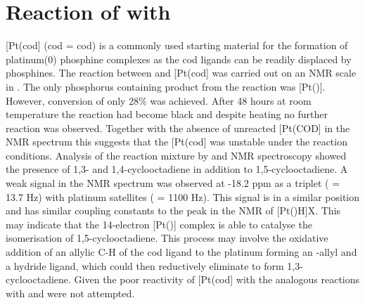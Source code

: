 
\section{Reaction of \tButhixantphos{} with \texorpdfstring{\ce{[Pt(cod)2]}} P}

[Pt(\acrshort{cod}] (\acrshort{cod} = \acrlong{cod}) is a commonly used starting material for the formation of platinum(0) phosphine complexes as the cod ligands can be readily displaced by phosphines.\cite{Green1975b, Green1977c}  The reaction between \tButhixantphos{} and [Pt(cod] was carried out on an NMR scale in .  The only phosphorus containing product from the reaction was [Pt(\tButhixantphos)].  However, conversion of only 28\% was achieved.  After 48 hours at room temperature the reaction had become black and despite heating no further reaction was observed.  Together with the absence of unreacted [Pt(COD] in the \proton{} NMR spectrum this suggests that the [Pt(cod] was unstable under the reaction conditions.  Analysis of the reaction mixture by \proton{} and \carbon{} NMR spectroscopy showed the presence of 1,3- and 1,4-cyclooctadiene in addition to 1,5-cyclooctadiene.  A weak signal in the \proton{} NMR spectrum was observed at -18.2 ppm as a triplet (\JPH{} = 13.7 Hz) with platinum satellites (\JPtH{} = 1100 Hz).  This signal is in a similar position and has similar coupling constants to the peak in the \proton{} NMR of [Pt(\tBuxantphos)H]X.  This may indicate that the 14-electron [Pt(\tButhixantphos)] complex is able to catalyse the isomerisation of 1,5-cyclooctadiene.  This process may involve the oxidative addition of an allylic C-H of the cod ligand to the platinum forming an -allyl and a hydride ligand, which could then reductively eliminate to form 1,3-cyclooctadiene.  Given the poor reactivity of [Pt(cod] with \tButhixantphos{} the analogous reactions with \tBusixantphos{} and \tBuxantphos{} were not attempted. 


